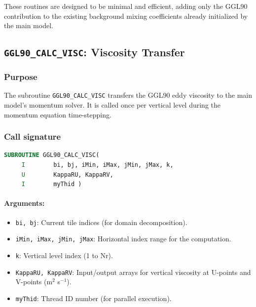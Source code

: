 \documentclass[12pt,letterpaper]{article}
\begin{document}
These routines are designed to be minimal and efficient, adding only the GGL90 contribution to the existing background mixing coefficients already initialized by the main model.

\subsection{\texttt{GGL90\_CALC\_VISC}: Viscosity Transfer}
\label{sec:visc_transfer}

\subsubsection{Purpose}

The subroutine \verb|GGL90_CALC_VISC| transfers the GGL90 eddy viscosity to the main model's momentum solver. It is called once per vertical level during the momentum equation time-stepping.

\subsubsection{Call signature}

\begin{lstlisting}[language=Fortran,caption={(ggl90\_calc\_visc.F:L7--10) Subroutine interface}]
      SUBROUTINE GGL90_CALC_VISC(
     I        bi, bj, iMin, iMax, jMin, jMax, k,
     U        KappaRU, KappaRV,
     I        myThid )
\end{lstlisting}

\paragraph{Arguments:}
\begin{itemize}
\item \verb|bi, bj|: Current tile indices (for domain decomposition).
\item \verb|iMin, iMax, jMin, jMax|: Horizontal index range for the computation.
\item \verb|k|: Vertical level index (1 to Nr).
\item \verb|KappaRU, KappaRV|: Input/output arrays for vertical viscosity at U-points and V-points (m$^2$ s$^{-1}$).
\item \verb|myThid|: Thread ID number (for parallel execution).
\end{itemize}
\end{document}
